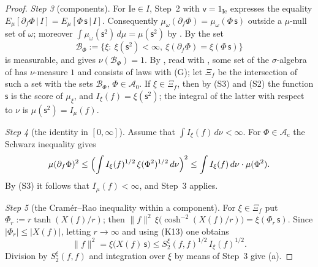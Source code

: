 \documentclass[11pt]{amsart}
\theoremstyle{definition}
\begin{document}
\begin{proof}
\emph{Step 3} (components).
For $\mathrm{Ie}\in I$, Step~2 with $\mathsf v=1_{\mathrm{Ie}}$ expresses the equality $E_\mu[\partial_f\Phi\,|\,I]=E_\mu[\Phi\,\mathsf s\,|\,I]$.
Consequently $\mu_\omega(\partial_f\Phi)=\mu_\omega(\Phi\,\mathsf s)$ outside a $\mu$-null set of $\omega$;
moreover $\int\mu_\omega(\mathsf s^2)\,d\mu=\mu(\mathsf s^2)$ by \cite[Proposition~45.6\,(a$'$)]{QEDIII}.
By \cite[Proposition~45.6\,(d0)]{QEDIII} the set
\begin{equation*}
\mathcal B_\Phi:=\{\xi:\ \xi(\mathsf s^2)<\infty,\ \xi(\partial_f\Phi)=\xi(\Phi\,\mathsf s)\}
\end{equation*}
is measurable, and \cite[Proposition~45.6\,(a$''$)]{QEDIII} gives $\nu(\mathcal B_\Phi)=1$.
By \cite[Proposition~45.6\,(c)]{QEDIII}, read with \cite[(n7)]{QEDIII}, some set of the $\sigma$-algebra of \cite[(n7)]{QEDIII} has $\nu$-measure $1$ and consists of laws with (G);
let $\Xi_f$ be the intersection of such a set with the sets $\mathcal B_\Phi$, $\Phi\in\mathcal A_0$.
If $\xi\in\Xi_f$, then by (S3) and (S2) the function $\mathsf s$ is the score of $\mu_\xi$, and $I_\xi(f)=\xi(\mathsf s^2)$;
the integral of the latter with respect to $\nu$ is $\mu(\mathsf s^2)=I_\mu(f)$.

\emph{Step 4} (the identity in $[0,\infty]$).
Assume that $\int I_\xi(f)\,d\nu<\infty$.
For $\Phi\in\mathcal A_{\mathrm c}$ the Schwarz inequality gives
\begin{equation*}
\mu(\partial_f\Phi)^2\le\Bigl(\int I_\xi(f)^{1/2}\,\xi(\Phi^2)^{1/2}\,d\nu\Bigr)^2\le\int I_\xi(f)\,d\nu\cdot\mu(\Phi^2).
\end{equation*}
By (S3) it follows that $I_\mu(f)<\infty$, and Step~3 applies.

\emph{Step 5} (the Cram\'er--Rao inequality within a component).
For $\xi\in\Xi_f$ put $\Phi_r:=r\tanh(X(f)/r)$;
then $\|f\|^2\,\allowbreak \xi\bigl(\cosh^{-2}(X(f)/r)\bigr)=\allowbreak \xi(\Phi_r\,\allowbreak \mathsf s)$.
Since $|\Phi_r|\le|X(f)|$, letting $r\to\infty$ and using (K13) one obtains
\begin{equation*}
\|f\|^2=\xi\bigl(X(f)\,\mathsf s\bigr)\le S_2^\xi(f,f)^{1/2}\,I_\xi(f)^{1/2}.
\end{equation*}
Division by $S_2^\xi(f,f)$ and integration over $\xi$ by means of Step~3 give (a).


\end{proof}
\end{document}

